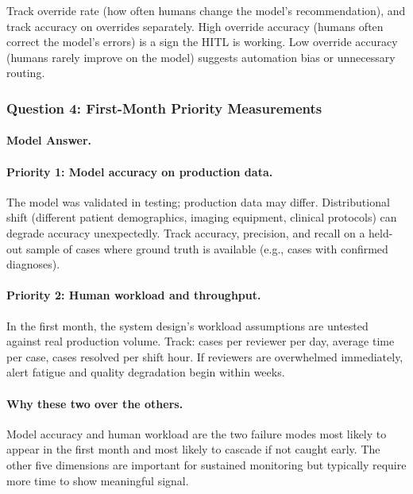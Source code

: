 Track override rate (how often humans change the model's recommendation), and track accuracy on overrides separately. High override accuracy (humans often correct the model's errors) is a sign the HITL is working. Low override accuracy (humans rarely improve on the model) suggests automation bias or unnecessary routing.

\subsubsection{Question 4: First-Month Priority Measurements}

\paragraph{Model Answer.}

\paragraph{Priority 1: Model accuracy on production data.}

The model was validated in testing; production data may differ. Distributional shift (different patient demographics, imaging equipment, clinical protocols) can degrade accuracy unexpectedly. Track accuracy, precision, and recall on a held-out sample of cases where ground truth is available (e.g., cases with confirmed diagnoses).

\paragraph{Priority 2: Human workload and throughput.}

In the first month, the system design's workload assumptions are untested against real production volume. Track: cases per reviewer per day, average time per case, cases resolved per shift hour. If reviewers are overwhelmed immediately, alert fatigue and quality degradation begin within weeks.

\paragraph{Why these two over the others.}

Model accuracy and human workload are the two failure modes most likely to appear in the first month and most likely to cascade if not caught early. The other five dimensions are important for sustained monitoring but typically require more time to show meaningful signal.

